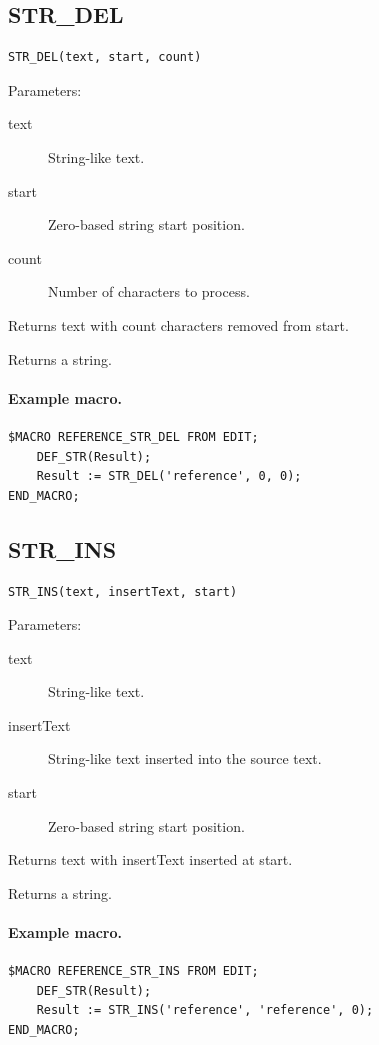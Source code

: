 \documentclass[a4paper,10pt,twoside,openany]{book}
\begin{document}
\label{prim:intrinsic-str-del}
\subsection*{STR\_DEL}
\begin{verbatim}
STR_DEL(text, start, count)
\end{verbatim}
Parameters:
\begin{description}
\item[text] String-like text.
\item[start] Zero-based string start position.
\item[count] Number of characters to process.
\end{description}

Returns text with count characters removed from start.

Returns a string.

\paragraph{Example macro.}
\begin{verbatim}
$MACRO REFERENCE_STR_DEL FROM EDIT;
    DEF_STR(Result);
    Result := STR_DEL('reference', 0, 0);
END_MACRO;
\end{verbatim}

\label{prim:intrinsic-str-ins}
\subsection*{STR\_INS}
\begin{verbatim}
STR_INS(text, insertText, start)
\end{verbatim}
Parameters:
\begin{description}
\item[text] String-like text.
\item[insertText] String-like text inserted into the source text.
\item[start] Zero-based string start position.
\end{description}

Returns text with insertText inserted at start.

Returns a string.

\paragraph{Example macro.}
\begin{verbatim}
$MACRO REFERENCE_STR_INS FROM EDIT;
    DEF_STR(Result);
    Result := STR_INS('reference', 'reference', 0);
END_MACRO;
\end{verbatim}
\end{document}
